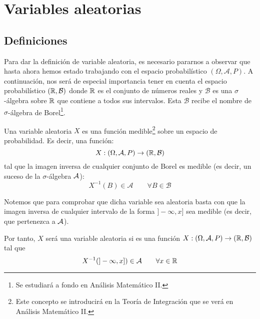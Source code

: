 \chapter{Variables aleatorias}
\section{Definiciones}


Para dar la definición de variable aleatoria, es necesario pararnos a observar que hasta ahora hemos estado trabajando con el espacio probabilístico $(\Omega, \mathcal{A}, P)$.
A continuación, nos será de especial importancia tener en cuenta el espacio probabilístico $(\mathbb R, \mathcal{B})$ donde $\mathbb R$ es el conjunto de números reales y $\mathcal{B}$ es una $\sigma$-álgebra sobre $\mathbb R$ que contiene a todos sus intervalos.
Esta $\mathcal{B}$ recibe el nombre de $\sigma$-álgebra de Borel\footnote{Se estudiará a fondo en Análisis Matemático II.}.

\begin{definicion}
    Una variable aleatoria $X$ es una función medible\footnote{Este concepto se introducirá en la Teoría de Integración que se verá en Análisis Matemático II.} sobre un espacio de probabilidad. 
    Es decir, una función:
    $$X:(\Omega, \mathcal{A}, P) \rightarrow (\mathbb R, \mathcal{B})$$
    tal que la imagen inversa de cualquier conjunto de Borel es medible (es decir, un suceso de la $\sigma$-álgebra $\mathcal{A}$):
    $$X^{-1}(B) \in \mathcal{A} \qquad \forall B \in \mathcal{B}$$
\end{definicion}

Notemos que para comprobar que dicha variable sea aleatoria basta con que la imagen inversa de cualquier intervalo de la forma $]-\infty, x]$ sea medible (es decir, que pertenezca a $\mathcal{A}$).

Por tanto, $X$ será una variable aleatoria si es una función $X :(\Omega, \mathcal{A}, P) \rightarrow (\mathbb R, \mathcal{B})$ tal que
$$X^{-1}(]-\infty, x]) \in \mathcal{A} \qquad \forall x \in \mathbb R$$

